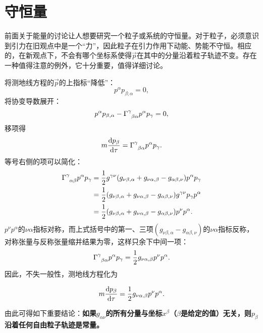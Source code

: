 \section{守恒量}
\label{sec7.4}
前面关于能量的讨论让人想要研究一个粒子或系统的守恒量。对于粒子，必须意识到引力在旧观点中是一个“力”，因此粒子在引力作用下动能、势能不守恒。相应的，在新观点下，不会有哪个坐标系使得$\vec{p}$在其中的分量沿着粒子轨迹不变。存在一种值得注意的例外，它十分重要，值得详细讨论。

将测地线方程的$\vec{p}$的上指标“降低”：
\begin{equation}
    p^\alpha p_{\beta; \alpha} = 0,
\label{equ7.25}
\end{equation}
将协变导数展开：
\begin{equation*}
    p^\alpha p_{\beta, \alpha} - \Gamma\indices{^\gamma_{\beta \alpha}} p^\alpha p_\gamma = 0,
\end{equation*}
移项得
\begin{equation}
    m \frac{\rd p_\beta}{\rd \tau} = \Gamma\indices{^\gamma_{\beta \alpha}} p^\alpha p_\gamma.
\label{equ7.26}
\end{equation}
等号右侧的项可以简化：
\begin{align}
    \Gamma\indices{^\gamma_{\alpha \beta}} p^\alpha p_\gamma &= \frac{1}{2} g^{\gamma \nu} (g_{\nu \beta, \alpha} + g_{\nu \alpha, \beta} - g_{\alpha \beta, \nu}) p^\alpha p_\gamma \notag \\
    &= \frac{1}{2} (g_{\nu \beta, \alpha} + g_{\nu \alpha, \beta} - g_{\alpha \beta, \nu}) g^{\gamma \nu} p_\gamma p^\alpha \notag \\
    &= \frac{1}{2} (g_{\nu \beta, \alpha} + g_{\nu \alpha, \beta} - g_{\alpha \beta, \nu}) p^\nu p^\alpha. \label{equ7.27}
\end{align}
$p^\nu p^\alpha$的$\nu \alpha$指标对称，而上式括号中的第一、三项$(g_{\nu \beta, \alpha} - g_{\alpha \beta, \nu})$的$\nu \alpha$指标反称，对称张量与反称张量缩并结果为零，这样只余下中间一项：
\begin{equation}
    \Gamma\indices{^\gamma_{\beta \alpha}} p^\alpha p_\gamma = \frac{1}{2} g_{\nu \alpha, \beta} p^\nu p^\alpha.
\label{equ7.28}
\end{equation}
因此，不失一般性，测地线方程化为
\begin{shaded}
\begin{equation}
    m \frac{\mathrm{d} p_\beta}{\mathrm{d} \tau} = \frac{1}{2} g_{\nu \alpha, \beta} p^\nu p^\alpha.
\label{equ7.29}
\end{equation}
\end{shaded}
由此可得如下重要结论：\textbf{如果$g_{\alpha \nu}$的所有分量与坐标$x^\beta$（$\beta$是给定的值）无关，则$p_\beta$沿着任何自由粒子轨迹是常量。}

